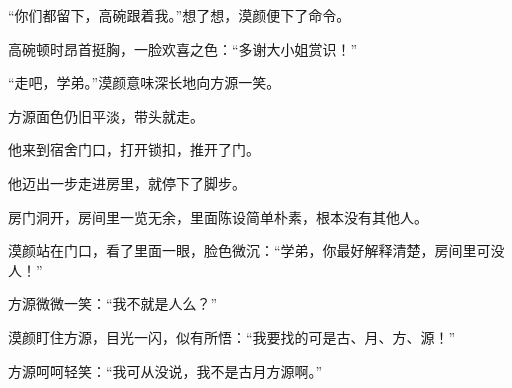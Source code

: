 \begin{this_body}
“你们都留下，高碗跟着我。”想了想，漠颜便下了命令。

高碗顿时昂首挺胸，一脸欢喜之色：“多谢大小姐赏识！”

“走吧，学弟。”漠颜意味深长地向方源一笑。

方源面色仍旧平淡，带头就走。

他来到宿舍门口，打开锁扣，推开了门。

他迈出一步走进房里，就停下了脚步。

房门洞开，房间里一览无余，里面陈设简单朴素，根本没有其他人。

漠颜站在门口，看了里面一眼，脸色微沉：“学弟，你最好解释清楚，房间里可没人！”

方源微微一笑：“我不就是人么？”

漠颜盯住方源，目光一闪，似有所悟：“我要找的可是古、月、方、源！”

方源呵呵轻笑：“我可从没说，我不是古月方源啊。”

\end{this_body}


